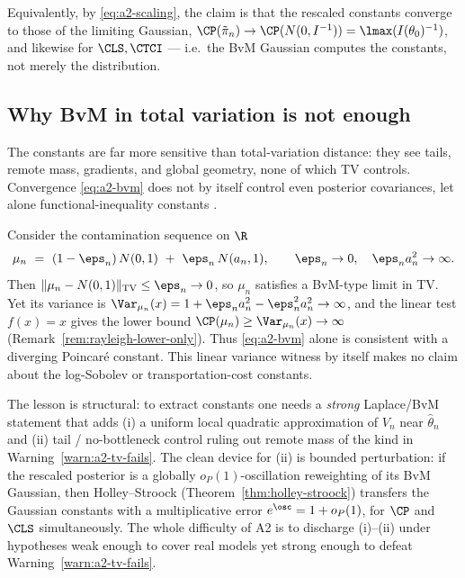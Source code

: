 \documentclass[../../main.tex]{subfiles}
\begin{document}
Equivalently, by \eqref{eq:a2-scaling}, the claim is that the rescaled constants converge to
those of the limiting Gaussian, $\CP(\tilde\pi_n)\to\CP(N(0,I^{-1}))=\lmax(I(\theta_0)^{-1})$,
and likewise for $\CLS,\CTCI$ --- i.e.\ the BvM Gaussian computes the constants, not merely the
distribution.

\subsection{Why BvM in total variation is not enough}
\label{subsec:a2-tv}

The constants are far more sensitive than total-variation distance: they see tails, remote
mass, gradients, and global geometry, none of which TV controls. Convergence
\eqref{eq:a2-bvm} does not by itself control even posterior covariances, let alone
functional-inequality constants \cite{KasprzakGiordanoBroderick2025}.

\begin{warning}
\label{warn:a2-tv-fails}
Consider the contamination sequence on $\R$
\[
  \mu_n\ =\ (1-\eps_n)\,N(0,1)\ +\ \eps_n\,N(a_n,1),
  \qquad \eps_n\to0,\quad \eps_n a_n^2\to\infty .
\]
Then $\|\mu_n-N(0,1)\|_{\mathrm{TV}}\le\eps_n\to0$, so $\mu_n$ satisfies a BvM-type limit in TV.
Yet its variance is $\Var_{\mu_n}(x)=1+\eps_n a_n^2-\eps_n^2a_n^2\to\infty$, and the linear test
$f(x)=x$ gives the lower bound $\CP(\mu_n)\ge\Var_{\mu_n}(x)\to\infty$
(Remark~\ref{rem:rayleigh-lower-only}). Thus \eqref{eq:a2-bvm} alone is consistent with a
diverging Poincar\'e constant. This linear variance witness by itself makes no claim about the
log-Sobolev or transportation-cost constants.
\end{warning}

The lesson is structural: to extract constants one needs a \emph{strong} Laplace/BvM statement
that adds (i) a uniform local quadratic approximation of $V_n$ near $\hat\theta_n$ and (ii)
tail / no-bottleneck control ruling out remote mass of the kind in
Warning~\ref{warn:a2-tv-fails}. The clean device for (ii) is bounded perturbation: if the
rescaled posterior is a globally $o_P(1)$-oscillation reweighting of its BvM Gaussian, then
Holley--Stroock (Theorem~\ref{thm:holley-stroock}) transfers the Gaussian constants with a
multiplicative error $e^{\osc}=1+o_P(1)$, for $\CP$ and $\CLS$ simultaneously. The whole
difficulty of A2 is to discharge (i)--(ii) under hypotheses weak enough to cover real models
yet strong enough to defeat Warning~\ref{warn:a2-tv-fails}.
\end{document}
